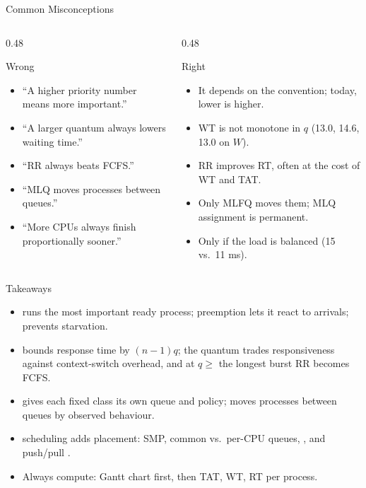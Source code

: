 \documentclass[aspectratio=169]{beamer}
\begin{document}
\begin{frame}{Common Misconceptions}
  \begin{columns}[T]
    \begin{column}{0.48\textwidth}
      \begin{block}{Wrong}
        \begin{itemize}
          \item ``A higher priority number means more important.''
          \item ``A larger quantum always lowers waiting time.''
          \item ``RR always beats FCFS.''
          \item ``MLQ moves processes between queues.''
          \item ``More CPUs always finish proportionally sooner.''
        \end{itemize}
      \end{block}
    \end{column}
    \begin{column}{0.48\textwidth}
      \begin{block}{Right}
        \begin{itemize}
          \item It depends on the convention; today, lower is higher.
          \item WT is not monotone in $q$ (13.0, 14.6, 13.0 on $W$).
          \item RR improves RT, often at the cost of WT and TAT.
          \item Only MLFQ moves them; MLQ assignment is permanent.
          \item Only if the load is balanced (15 vs.\ 11 ms).
        \end{itemize}
      \end{block}
    \end{column}
  \end{columns}
\end{frame}

\begin{frame}{Takeaways}
  \begin{itemize}
    \item {} runs the most important ready process; preemption
      lets it react to arrivals;  prevents starvation.
    \item {} bounds response time by $(n-1)q$; the quantum trades
      responsiveness against context-switch overhead, and at $q \ge$ the
      longest burst RR becomes FCFS.
    \item {} gives each fixed class its own queue and policy;
       moves processes between queues by observed behaviour.
    \item {} scheduling adds placement: SMP, common vs.\
      per-CPU queues, , and push/pull .
    \item Always compute: Gantt chart first, then TAT, WT, RT per process.
  \end{itemize}
\end{frame}
\end{document}
